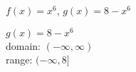 {$f(x) = x^6$, $g(x) = 8-x^6$
}
{$g(x) = 8-x^{6}$\\
domain: $(-\infty, \infty)$\\
range: $(-\infty, 8]$

\begin{center}
\end{center}}